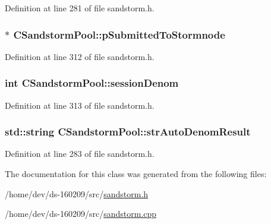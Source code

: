 Definition at line 281 of file sandstorm.\+h.

\hypertarget{class_c_sandstorm_pool_a61589289244edd2ca3bc539d725d885c}{}
\subsubsection[{p\+Submitted\+To\+Stormnode}]{$\ast$ C\+Sandstorm\+Pool\+::p\+Submitted\+To\+Stormnode}\label{class_c_sandstorm_pool_a61589289244edd2ca3bc539d725d885c}


Definition at line 312 of file sandstorm.\+h.

\hypertarget{class_c_sandstorm_pool_a29ef4f682594e010c8401617463fb57e}{}
\subsubsection[{session\+Denom}]{\setlength{\rightskip}{0pt plus 5cm}int C\+Sandstorm\+Pool\+::session\+Denom}\label{class_c_sandstorm_pool_a29ef4f682594e010c8401617463fb57e}


Definition at line 313 of file sandstorm.\+h.

\hypertarget{class_c_sandstorm_pool_aa9137e1fe81c9f7a8edd55b2705a1938}{}
\subsubsection[{str\+Auto\+Denom\+Result}]{\setlength{\rightskip}{0pt plus 5cm}std\+::string C\+Sandstorm\+Pool\+::str\+Auto\+Denom\+Result}\label{class_c_sandstorm_pool_aa9137e1fe81c9f7a8edd55b2705a1938}


Definition at line 283 of file sandstorm.\+h.



The documentation for this class was generated from the following files\+:\begin{DoxyCompactItemize}
\item 
/home/dev/ds-\/160209/src/\hyperlink{sandstorm_8h}{sandstorm.\+h}\item 
/home/dev/ds-\/160209/src/\hyperlink{sandstorm_8cpp}{sandstorm.\+cpp}\end{DoxyCompactItemize}
